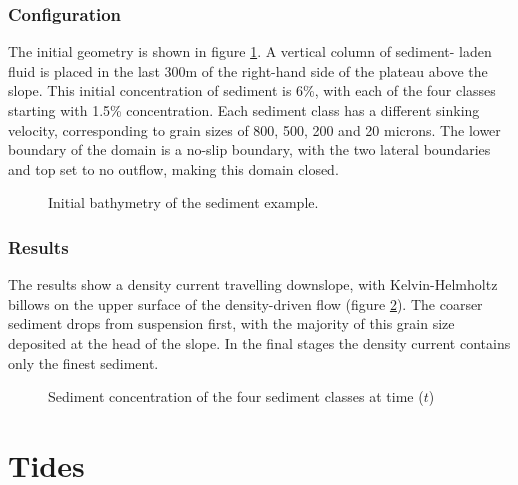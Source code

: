 \subsubsection{Configuration}

The initial geometry is shown in figure \ref{Fig:sediment:bathymetry}. A vertical column of sediment-
laden fluid is placed in the last 300m of the right-hand side of the plateau above the slope. 
This initial concentration of sediment is 6\%, with each of the four classes starting with
1.5\% concentration. Each sediment class has a different sinking velocity, corresponding to 
grain sizes of 800, 500, 200 and 20 microns. The lower boundary of the domain is a 
no-slip boundary, with the two lateral boundaries and top set to no outflow, making this domain closed.

\begin{figure}[ht]
  \centering
  \caption{Initial bathymetry of the sediment example.}
  \label{Fig:sediment:bathymetry}
\end{figure}

\subsubsection{Results}

The results show a density current travelling downslope, with Kelvin-Helmholtz billows
on the upper surface of the density-driven flow (figure \ref{fig:sediment_concentration}). 
The coarser sediment drops from suspension first, with the majority of this
grain size deposited at the head of the slope. In the final stages the density current contains
only the finest sediment.
\begin{figure}[ht]
  \centering
  \caption{Sediment concentration of the four sediment classes at time ($t$)}
  \label{fig:sediment_concentration}
\end{figure}





\section{Tides}
\label{sect:tides}

